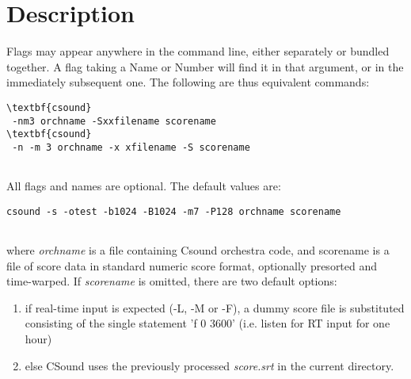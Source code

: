 \begin{comment}
\documentclass[10pt]{article}
\usepackage{fullpage, graphicx, url}
\setlength{\parskip}{1ex}
\setlength{\parindent}{0ex}
\title{Description}



\begin{tabular}{ccc}
The Alternative Csound Reference Manual & & \\
Previous &The Csound Command &Next

\end{tabular}

\end{comment}
\section{Description}


  Flags may appear anywhere in the command line, either separately or bundled together. A flag taking a Name or Number will find it in that argument, or in the immediately subsequent one. The following are thus equivalent commands: 


 
\begin{lstlisting}
\textbf{csound}
 -nm3 orchname -Sxxfilename scorename
\textbf{csound}
 -n -m 3 orchname -x xfilename -S scorename
       
\end{lstlisting}


 


  All flags and names are optional. The default values are: 


 
\begin{lstlisting}
csound -s -otest -b1024 -B1024 -m7 -P128 orchname scorename
       
\end{lstlisting}


 


  where \emph{orchname}
 is a file containing Csound orchestra code, and scorename is a file of score data in standard numeric score format, optionally presorted and time-warped. If \emph{scorename}
 is omitted, there are two default options: 


 
\begin{enumerate}
\item 

 if real-time input is expected (-L, -M or -F), a dummy score file is substituted consisting of the single statement 'f 0 3600' (i.e. listen for RT input for one hour)

\item 

 else CSound uses the previously processed \emph{score.srt}
 in the current directory.


\end{enumerate}


